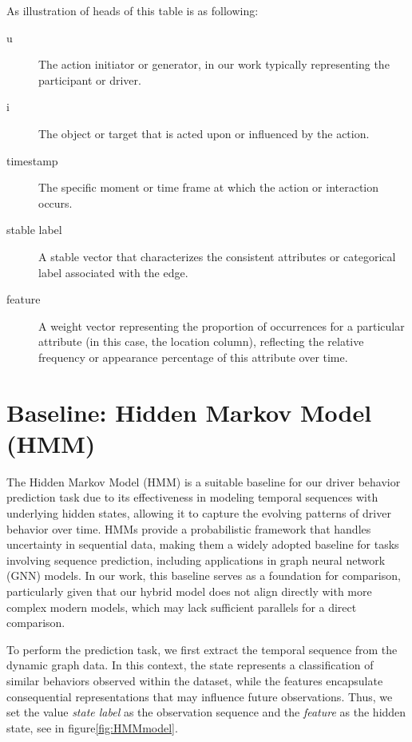 As illustration of heads of this table is as following:

\begin{description}
    \item[u] The action initiator or generator, in our work typically representing the participant or driver.
    \item[i] The object or target that is acted upon or influenced by the action.
    \item[timestamp] The specific moment or time frame at which the action or interaction occurs.
    \item[stable label] A stable vector that characterizes the consistent attributes or categorical label associated with the edge.
    \item[feature] A weight vector representing the proportion of occurrences for a particular attribute (in this case, the location column), reflecting the relative frequency or appearance percentage of this attribute over time.
\end{description}



\section{Baseline: Hidden Markov Model (HMM)}


The Hidden Markov Model (HMM) is a suitable baseline for our driver behavior prediction task due to its effectiveness in modeling temporal sequences with underlying hidden states, allowing it to capture the evolving patterns of driver behavior over time. HMMs provide a probabilistic framework that handles uncertainty in sequential data, making them a widely adopted baseline for tasks involving sequence prediction, including applications in graph neural network (GNN) models. In our work, this baseline serves as a foundation for comparison, particularly given that our hybrid model does not align directly with more complex modern models, which may lack sufficient parallels for a direct comparison.

To perform the prediction task, we first extract the temporal sequence from the dynamic graph data. In this context, the state represents a classification of similar behaviors observed within the dataset, while the features encapsulate consequential representations that may influence future observations. Thus, we set the value \textit{state label} as the observation sequence and the \textit{feature} as the hidden state, see in figure\ref{fig:HMMmodel}.

